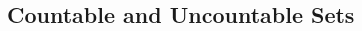 \documentclass[8pt,landscape]{article}
\begin{document}
\begin{multicols}{3}
    \subsection{Countable and Uncountable Sets}









\end{multicols}
\end{document}

